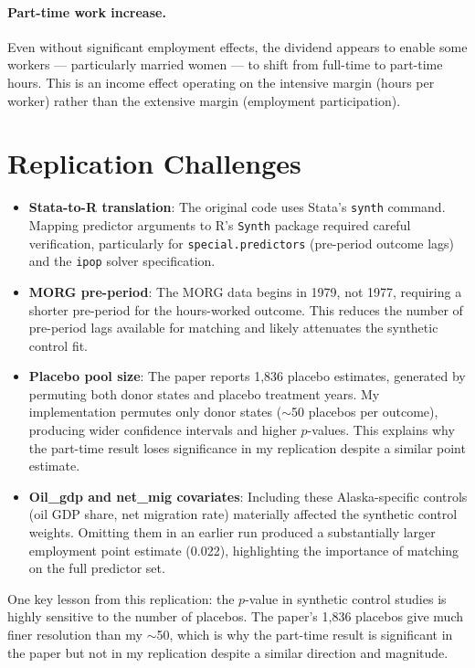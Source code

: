 \documentclass[12pt]{article}
\begin{document}
\paragraph{Part-time work increase.}
Even without significant employment effects, the dividend appears to enable some workers — particularly married women — to shift from full-time to part-time hours. This is an income effect operating on the intensive margin (hours per worker) rather than the extensive margin (employment participation).

\section{Replication Challenges}

\begin{itemize}
  \item \textbf{Stata-to-R translation}: The original code uses Stata's \texttt{synth} command. Mapping predictor arguments to R's \texttt{Synth} package required careful verification, particularly for \texttt{special.predictors} (pre-period outcome lags) and the \texttt{ipop} solver specification.

  \item \textbf{MORG pre-period}: The MORG data begins in 1979, not 1977, requiring a shorter pre-period for the hours-worked outcome. This reduces the number of pre-period lags available for matching and likely attenuates the synthetic control fit.

  \item \textbf{Placebo pool size}: The paper reports 1,836 placebo estimates, generated by permuting both donor states and placebo treatment years. My implementation permutes only donor states ($\sim$50 placebos per outcome), producing wider confidence intervals and higher $p$-values. This explains why the part-time result loses significance in my replication despite a similar point estimate.

  \item \textbf{Oil\_gdp and net\_mig covariates}: Including these Alaska-specific controls (oil GDP share, net migration rate) materially affected the synthetic control weights. Omitting them in an earlier run produced a substantially larger employment point estimate (0.022), highlighting the importance of matching on the full predictor set.
\end{itemize}

One key lesson from this replication: the $p$-value in synthetic control studies is highly sensitive to the number of placebos. The paper's 1,836 placebos give much finer resolution than my $\sim$50, which is why the part-time result is significant in the paper but not in my replication despite a similar direction and magnitude.
\end{document}
